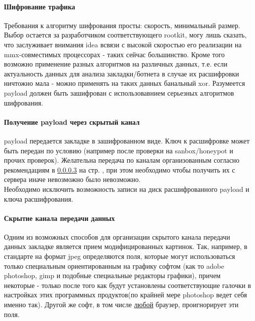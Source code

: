 \paragraph{Шифрование трафика\\}

Требования к алгоритму шифрования просты: скорость, минимальный размер.
Выбор остается за разработчиком соответствующего rootkit, могу лишь
сказать, что заслуживает внимания idea всвязи с
высокой скоростью его реализации на
mmx-совместимых процессорах - таких сейчас большинство.
Кроме того возможно применение разных алгоритмов на различных данных, т.е. если актуальность
данных для анализа закладки/ботнета в случае их расшифровки ничтожно мала - можно применять на таких
данных банальный xor. Разумеется payload должен быть зашифрован с использовавнием серьезных алгоритмов
шифрования.

\paragraph{Получение payload через скрытый канал\\}
payload передается закладке в зашифрованном виде. Ключ к расшифровке может быть
передан по условию (например после проверки на sanbox/honeypot и прочих проверок).
Желательна передача по каналам организованным согласно рекомендациям в \ref{hidden_tunnel} на стр. \pageref{hidden_tunnel}, при этом необходимо чтобы получить их с сервера иначе невозможно было невозможно.\\
Необходимо исключить возможность записи на диск расшифрованного payload
и ключа расшифрования.

\paragraph{Скрытие канала передачи данных\\}
\label{hidden_tunnel}
Одним из возможных способов для организации скрытого канала передачи данных закладке
является прием модифицированных картинок. Так, например, в стандарте на формат jpeg
определяются поля, которые могут использоваться только специальным
ориентированным на графику софтом (как то adobe photoshop, gimp и
подобные специальные редакторы графики), причем некоторые - только после
того как будут установлены соответствующие галочки в настройках этих
программных продуктов(по крайней мере photoshop ведет себя именно так).
Другой же софт, в том числе \underline{любой} браузер, проигнорирует эти
поля.\\

